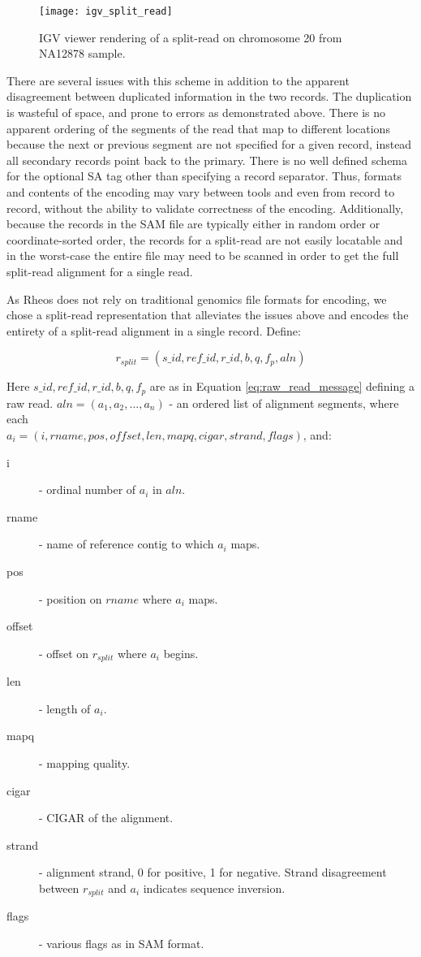 \begin{figure}[H]
    \texttt{[image: igv\_split\_read]}
    \centering
    \caption {IGV viewer rendering of a split-read on chromosome 20 from NA12878 sample.}
    \label{fig:igv_split_read}
\end{figure}

There are several issues with this scheme in addition to the apparent disagreement between duplicated information in the two records. The duplication is wasteful of space, and prone to errors as demonstrated above. There is no apparent ordering of the segments of the read that map to different locations because the next or previous segment are not specified for a given record, instead all secondary records point back to the primary. There is no well defined schema for the optional SA tag other than specifying a record separator. Thus, formats and contents of the encoding may vary between tools and even from record to record, without the ability to validate correctness of the encoding. Additionally, because the records in the SAM file are typically either in random order or coordinate-sorted order, the records for a split-read are not easily locatable and in the worst-case the entire file may need to be scanned in order to get the full split-read alignment for a single read. 

As Rheos does not rely on traditional genomics file formats for encoding, we chose a split-read representation that alleviates the issues above and encodes the entirety of a split-read alignment in a single record. Define:

\begin{equation}
    \label{eq:split_read}
    r_{split} = (s\_id, ref\_id, r\_id, b, q, f_p, aln)
\end{equation}

Here $s\_id, ref\_id, r\_id, b, q, f_p$ are as in Equation \ref{eq:raw_read_message} defining a raw read. $aln = (a_1,a_2,...,a_n)$ - an ordered list of alignment segments, where each \\$a_i = (i, rname, pos, offset, len, mapq, cigar, strand, flags)$, and:

\begin{description}
    \item[i] - ordinal number of $a_i$ in $aln$.
    \item[rname] - name of reference contig to which $a_i$ maps.
    \item[pos] - position on $rname$ where $a_i$ maps.
    \item[offset] - offset on $r_{split}$ where $a_i$ begins.
    \item[len] - length of $a_i$.
    \item[mapq] - mapping quality.
    \item[cigar] - CIGAR of the alignment.
    \item[strand] - alignment strand, 0 for positive, 1 for negative. Strand disagreement between $r_{split}$ and $a_i$ indicates sequence inversion.
    \item[flags] - various flags as in SAM format.   
\end{description}

